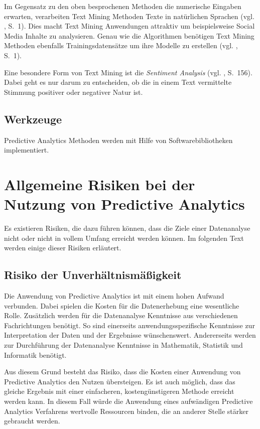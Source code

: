 Im Gegensatz zu den oben besprochenen Methoden die numerische Eingaben erwarten, verarbeiten Text Mining
Methoden Texte in natürlichen Sprachen (vgl. \cite{Weiss}, S.~1). Dies macht Text Mining Anwendungen attraktiv um
beispielsweise Social Media Inhalte zu analysieren. Genau wie die \grqq Algorithmen benötigen Text Mining
Methoden ebenfalls Trainingsdatensätze um ihre Modelle zu erstellen (vgl. \cite{Weiss}, S.~1).

Eine besondere Form von Text Mining ist die \emph{Sentiment Analysis} (vgl. \cite{Weiss}, S.~156). Dabei geht es nur darum
zu entscheiden, ob die in einem Text vermittelte Stimmung positiver oder negativer Natur ist.

\subsection{Werkzeuge}

Predictive Analytics Methoden werden mit Hilfe von Softwarebibliotheken implementiert.


\section{Allgemeine Risiken bei der Nutzung von Predictive Analytics}

Es existieren Risiken, die dazu führen können, dass die Ziele einer
Datenanalyse nicht oder nicht in vollem Umfang erreicht werden können.
Im folgenden Text werden einige dieser Risiken erläutert.

\subsection{Risiko der Unverhältnismäßigkeit}

Die Anwendung von Predictive Analytics ist mit einem hohen Aufwand verbunden.
Dabei spielen die Kosten für die Datenerhebung eine wesentliche Rolle.
Zusätzlich werden für die Datenanalyse Kenntnisse aus verschiedenen
Fachrichtungen benötigt. So sind einerseits anwendungsspezifische Kenntnisse
zur Interpretation der Daten und der Ergebnisse wünschenswert. Andererseits
werden zur Durchführung der Datenanalyse Kenntnisse in Mathematik, Statistik und
Informatik benötigt.

Aus diesem Grund besteht das Risiko, dass die Kosten einer Anwendung von
Predictive Analytics den Nutzen übersteigen. Es ist auch möglich, dass das
gleiche Ergebnis mit einer einfacheren, kostengünstigeren Methode erreicht
werden kann. In diesem Fall würde die Anwendung eines aufwändigen Predictive
Analytics Verfahrens wertvolle Ressourcen binden, die an anderer Stelle stärker
gebraucht werden. 

